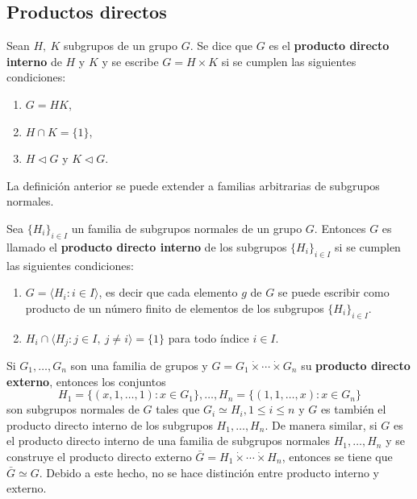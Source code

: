 \subsection{Productos directos}
\begin{definicion}
Sean $H,\ K$ subgrupos de un grupo $G$. Se dice que $G$ es el \textbf{producto directo interno} de $H$ y $K$ y se escribe $G = H \times K$ si se cumplen las siguientes condiciones:
\begin{enumerate}
\item $G=HK$,
\item $H \cap K = \{1\}$,
\item $H \triangleleft G$ y $K \triangleleft G$.
\end{enumerate}
\end{definicion}
La definición anterior se puede extender a familias arbitrarias de subgrupos normales.
\begin{definicion}
Sea $\{H_i\}_{i \in I}$ un familia de subgrupos normales de un grupo $G$. Entonces $G$ es llamado el \textbf{producto directo interno} de los subgrupos $\{H_i\}_{i \in I}$ si se cumplen las siguientes condiciones:
\begin{enumerate}
\item $G =\langle H_i \colon i \in I \rangle$, es decir que cada elemento $g$ de $G$ se puede escribir como producto de un número finito de elementos de los subgrupos $\{H_i\}_{i \in I}$.
\item $H_i \cap \langle H_j \colon j \in I, \ j \neq i \rangle = \{1\}$ para todo índice $i \in I$.
\end{enumerate}
\end{definicion} 
Si $G_1, \dots, G_n$ son una familia de grupos y $G = G_1\dot{\times}\cdots\dot{\times}G_n$ su \textbf{producto directo externo}, entonces los conjuntos
\[ H_1=\{(x,1,\dots,1)\colon x \in G_1\},\dots,H_n=\{(1,1,\dots,x)\colon x \in G_n \} \] son subgrupos normales de $G$ tales que $G_i \simeq H_i,1\leq i \leq n$ y $G$ es también el producto directo interno de los subgrupos $H_1, \dots, H_n$.
De manera similar, si $G$ es el producto directo interno de una familia de subgrupos normales $H_1,\dots,H_n$ y se construye el producto directo externo $\bar{G} = H_1\dot{\times}\cdots\dot{\times}H_n$, entonces se tiene que $\bar{G} \simeq G$. Debido a este hecho, no se hace distinción entre producto interno y externo.

